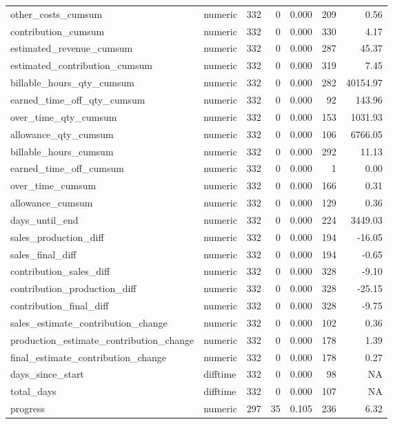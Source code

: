 \begin{landscape}
\begin{longtable}[t]{llrrrrr}
other\_costs\_cumsum & numeric & 332 & 0 & 0.000 & 209 & 0.56\\
contribution\_cumsum & numeric & 332 & 0 & 0.000 & 330 & 4.17\\
estimated\_revenue\_cumsum & numeric & 332 & 0 & 0.000 & 287 & 45.37\\
estimated\_contribution\_cumsum & numeric & 332 & 0 & 0.000 & 319 & 7.45\\
billable\_hours\_qty\_cumsum & numeric & 332 & 0 & 0.000 & 282 & 40154.97\\
earned\_time\_off\_qty\_cumsum & numeric & 332 & 0 & 0.000 & 92 & 143.96\\
over\_time\_qty\_cumsum & numeric & 332 & 0 & 0.000 & 153 & 1031.93\\
allowance\_qty\_cumsum & numeric & 332 & 0 & 0.000 & 106 & 6766.05\\
billable\_hours\_cumsum & numeric & 332 & 0 & 0.000 & 292 & 11.13\\
earned\_time\_off\_cumsum & numeric & 332 & 0 & 0.000 & 1 & 0.00\\
over\_time\_cumsum & numeric & 332 & 0 & 0.000 & 166 & 0.31\\
allowance\_cumsum & numeric & 332 & 0 & 0.000 & 129 & 0.36\\
days\_until\_end & numeric & 332 & 0 & 0.000 & 224 & 3449.03\\
sales\_production\_diff & numeric & 332 & 0 & 0.000 & 194 & -16.05\\
sales\_final\_diff & numeric & 332 & 0 & 0.000 & 194 & -0.65\\
contribution\_sales\_diff & numeric & 332 & 0 & 0.000 & 328 & -9.10\\
contribution\_production\_diff & numeric & 332 & 0 & 0.000 & 328 & -25.15\\
contribution\_final\_diff & numeric & 332 & 0 & 0.000 & 328 & -9.75\\
sales\_estimate\_contribution\_change & numeric & 332 & 0 & 0.000 & 102 & 0.36\\
production\_estimate\_contribution\_change & numeric & 332 & 0 & 0.000 & 178 & 1.39\\
final\_estimate\_contribution\_change & numeric & 332 & 0 & 0.000 & 178 & 0.27\\
days\_since\_start & difftime & 332 & 0 & 0.000 & 98 & NA\\
total\_days & difftime & 332 & 0 & 0.000 & 107 & NA\\
progress & numeric & 297 & 35 & 0.105 & 236 & 6.32\\

\end{longtable}
\end{landscape}
